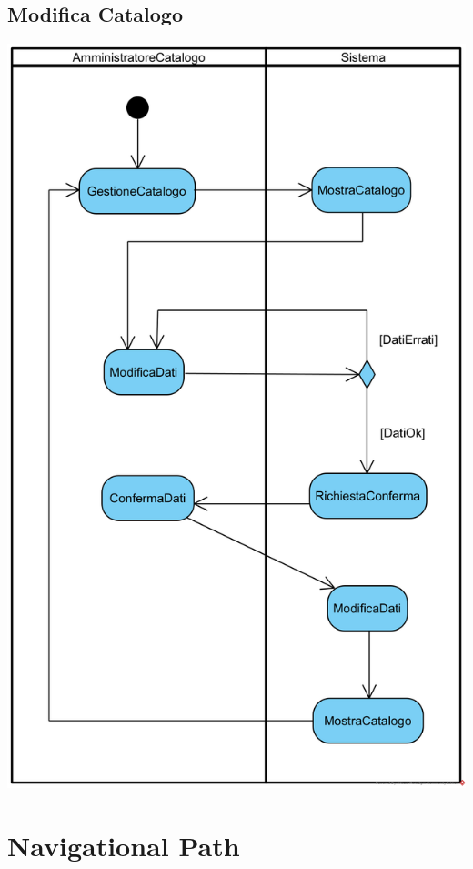 \documentclass[12pt,a4paper]{article}
\begin{document}
\subsection{Modifica Catalogo}
\begin{center}
\includegraphics[scale=1.55]{ActivityDiagram/AmministratoreCatalogoModificaArticoloCatalogo}
\end{center}

\newpage
\section{Navigational Path}
\end{document}
